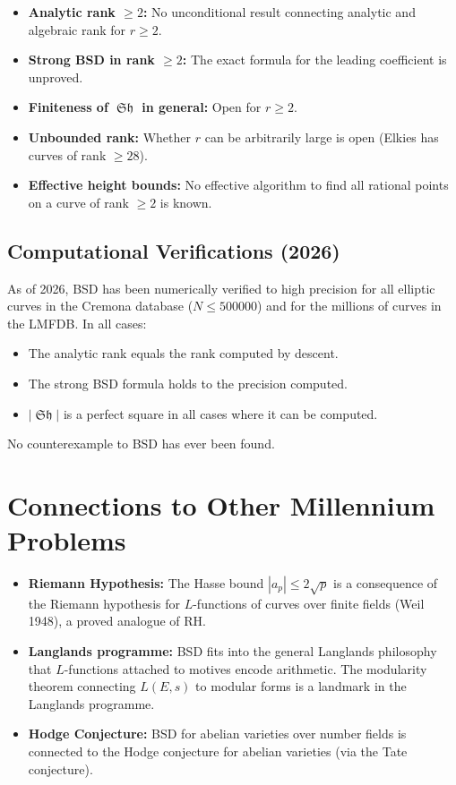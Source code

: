 \documentclass[12pt,a4paper]{article}
\theoremstyle{remark}
\DeclareMathOperator{\Sha}{\mathfrak{Sh}}
\begin{document}
\begin{itemize}[nosep]
  \item \textbf{Analytic rank $\geq 2$:} No unconditional result connecting analytic and
    algebraic rank for $r \geq 2$.
  \item \textbf{Strong BSD in rank $\geq 2$:} The exact formula for the leading coefficient
    is unproved.
  \item \textbf{Finiteness of $\Sha$ in general:} Open for $r \geq 2$.
  \item \textbf{Unbounded rank:} Whether $r$ can be arbitrarily large is open
    (Elkies has curves of rank $\geq 28$).
  \item \textbf{Effective height bounds:} No effective algorithm to find all rational
    points on a curve of rank $\geq 2$ is known.
\end{itemize}

\subsection{Computational Verifications (2026)}

As of 2026, BSD has been numerically verified to high precision for all elliptic curves
in the Cremona database ($N \leq 500000$) and for the millions of curves in the LMFDB.
In all cases:
\begin{itemize}[nosep]
  \item The analytic rank equals the rank computed by descent.
  \item The strong BSD formula holds to the precision computed.
  \item $|\Sha|$ is a perfect square in all cases where it can be computed.
\end{itemize}

No counterexample to BSD has ever been found.

\section{Connections to Other Millennium Problems}

\begin{itemize}[nosep]
  \item \textbf{Riemann Hypothesis:} The Hasse bound $|a_p| \leq 2\sqrt{p}$ is a
    consequence of the Riemann hypothesis for $L$-functions of curves over finite fields
    (Weil 1948), a proved analogue of RH.
  \item \textbf{Langlands programme:} BSD fits into the general Langlands philosophy that
    $L$-functions attached to motives encode arithmetic.  The modularity theorem connecting
    $L(E,s)$ to modular forms is a landmark in the Langlands programme.
  \item \textbf{Hodge Conjecture:} BSD for abelian varieties over number fields is
    connected to the Hodge conjecture for abelian varieties (via the Tate conjecture).
\end{itemize}
\end{document}
